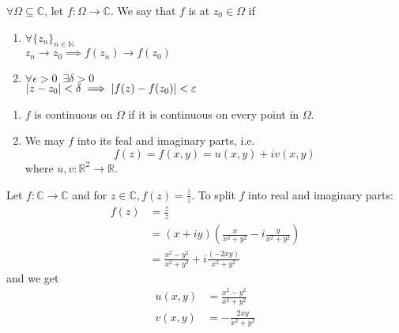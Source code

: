 \documentclass[notoc,notitlepage]{tufte-book}
\begin{document}
\begin{defn}[Continuity]\label{defn:Continuity}
	$\forall \Omega \subseteq \mathbb{C}$, let $f: \Omega \to \mathbb{C}$. We say that $f$ is  at $z_0 \in \Omega$ if
	\begin{enumerate}
		\item $\forall \{z_n\}_{n \in \mathbb{N}}$ \\
				$z_n \to z_0 \implies f(z_n) \to f(z_0)$
		\item $\forall \epsilon > 0 \enspace \exists \delta > 0$ \\
				$\left|z - z_0\right| < \delta \implies \left|f(z) - f(z_0)\right| < \varepsilon$
	\end{enumerate}
\end{defn}

\begin{remark}
	\begin{enumerate}
		\item $f$ is continuous on $\Omega$ if it is continuous on every point in $\Omega$.
		\item We may  $f$ into its feal and imaginary parts, i.e.
			\begin{equation}\label{eq:complex function expressed in real-valued functions}
				f(z) = f(x, y) = u(x, y) + iv(x, y)
			\end{equation}
			where $u, v : \mathbb{R}^2 \to \mathbb{R}$.
	\end{enumerate}
\end{remark}

\begin{eg}
	Let $f: \mathbb{C} \to \mathbb{C}$ and for $z \in \mathbb{C}, f(z) = \frac{\bar{z}}{z}$. To split $f$ into real and imaginary parts:
	\begin{align*}
		f(z) &= \frac{\bar{z}}{z} \\
			&= (x + iy)\left(\frac{x}{x^2 + y^2} - i \frac{y}{x^2 + y^2} \right) \\
			&= \frac{x^2 - y^2}{x^2 + y^2} + i \frac{(-2xy)}{x^2 + y^2} 
	\end{align*}
	and we get
	\begin{align*}
		u(x, y) &= \frac{x^2 - y^2}{x^2 + y^2} \\
		v(x, y) &= -\frac{2xy}{x^2 + y^2} 
	\end{align*}
\end{eg}


\end{document}
